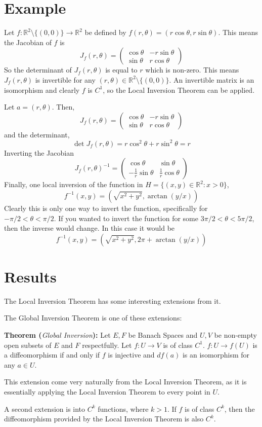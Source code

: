 \documentclass{article}
\begin{document}
\section{Example}

Let \(f:\mathbb{R}^2\setminus\{(0,0)\}\to\mathbb{R}^2\) be defined by \(f(r,\theta)=(r\cos\theta,r\sin\theta)\).  This means the Jacobian of \(f\) is
\[J_f(r,\theta)=\begin{pmatrix}\cos\theta &-r\sin\theta\\\sin\theta &r\cos\theta\end{pmatrix}\]
So the determinant of \(J_f(r,\theta)\) is equal to \(r\) which is non-zero.  This means \(J_f(r,\theta)\) is invertible for any \((r,\theta)\in\mathbb{R}^2\setminus\{(0,0)\}\).  An invertible matrix is an isomorphism and clearly \(f\) is \(C^1\), so the Local Inversion Theorem can be applied.

Let \(a=(r,\theta)\).  Then,
\[J_f(r,\theta)=\begin{pmatrix}\cos\theta &-r\sin\theta\\\sin\theta &r\cos\theta\end{pmatrix}\]
and the determinant,
\[\det J_f(r,\theta)=r\cos^2\theta+r\sin^2\theta=r\]
Inverting the Jacobian
\[J_f(r,\theta)^{-1}=\begin{pmatrix}\cos\theta &\sin\theta\\-\frac{1}{r}\sin\theta &\frac{1}{r}\cos\theta\end{pmatrix}\]
Finally, one local inversion of the function in \(H=\{(x,y)\in\mathbb{R}^2:x>0\}\),
\[f^{-1}(x,y)=(\sqrt{x^2+y^2},\arctan(y/x))\]
Clearly this is only one way to invert the function, specifically for \(-\pi/2<\theta<\pi/2\).  If you wanted to invert the function for some \(3\pi/2<\theta<5\pi/2\), then the inverse would change.  In this case it would be
\[f^{-1}(x,y)=(\sqrt{x^2+y^2},2\pi+\arctan(y/x))\]

\section{Results}

The Local Inversion Theorem has some interesting extensions from it.

The Global Inversion Theorem is one of these extensions:

\textbf{Theorem (}\textit{Global Inversion}\textbf{):} Let \(E,F\) be Banach Spaces and \(U,V\) be non-empty open subsets of \(E\) and \(F\) respectfully.  Let \(f:U\to V\) is of class \(C^1\).  \(f:U\to f(U)\) is a diffeomorphism if and only if \(f\) is injective and \(df(a)\) is an isomorphism for any \(a\in U\).

This extension come very naturally from the Local Inversion Theorem, as it is essentially applying the Local Inversion Theorem to every point in \(U\).

A second extension is into \(C^k\) functions, where \(k>1\).  If \(f\) is of class \(C^k\), then the diffeomorphism provided by the Local Inversion Theorem is also \(C^k\).

\newpage
\printbibliography
\end{document}
